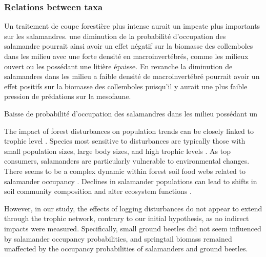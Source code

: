 \subsubsection*{Relations between taxa}
\label{disc:relations_between_taxa}



Un traitement de coupe forestière plus intense aurait un impcate plus importants sur les salamandres. 
une diminution de la probabilité d'occupation des salamandre pourrait ainsi avoir un effet négatif sur la biomasse des collemboles dans les milieu avec une forte densité en macroinvertébrés, comme les milieux ouvert ou les possédant une litière épaisse.
En revanche la diminution de salamandres dans les milieu a faible densité de macroinvertébré pourrait avoir un effet positifs sur la biomasse des collemboles puisqu'il y aurait une plus faible pression de prédations sur la mesofaune. 

Baisse de probabilité d'occupation des salamandres dans les milieu possédant un 



The impact of forest disturbances on population trends can be closely linked to trophic level \citep{Gotelli2006FoodWebModels,Nolte2019Habitatspecialization}. 
Species most sensitive to disturbances are typically those with small population sizes, large body sizes, and high trophic levels \citep{Seibold2015Associationextinction,Nolte2019Habitatspecialization,Hagge2021Whatdoes}. 
As top consumers, salamanders are particularly vulnerable to environmental changes. 
There seems to be a complex dynamic within forest soil food webs related to salamander occupancy \citep{baileyEstimatingSiteOccupancy2004,Walton2006Salamandersforestfloor,Rooney2000impactsalamander}. 
Declines in salamander populations can lead to shifts in soil community composition and alter ecosystem functions \citep{Hairston1987evolutioncompeting,Wyman1998Experimentalassessment,Rooney2000impactsalamander,Walton2005Contrastingeffects}.

However, in our study, the effects of logging disturbances do not appear to extend through the trophic network, contrary to our initial hypothesis, as no indirect impacts were measured.
Specifically, small ground beetles did not seem influenced by salamander occupancy probabilities, and springtail biomass remained unaffected by the occupancy probabilities of salamanders and ground beetles.

